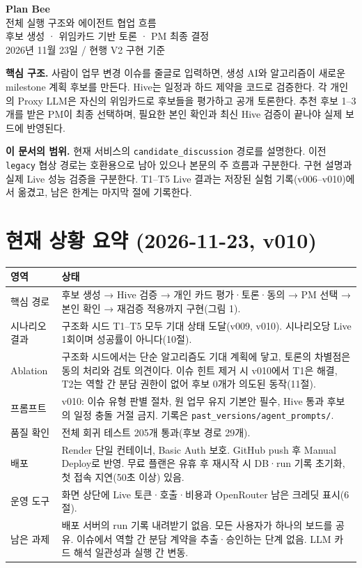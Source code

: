 \documentclass[11pt,a4paper]{article}
\begin{document}
\begin{center}
{\Huge\bfseries Plan Bee}\\[5mm]
{\LARGE 전체 실행 구조와 에이전트 협업 흐름}\\[3mm]
{\large 후보 생성 · 위임카드 기반 토론 · PM 최종 결정}\\[3mm]
2026년 11월 23일 / 현행 V2 구현 기준
\end{center}
\vspace{3mm}
\textbf{핵심 구조.} 사람이 업무 변경 이슈를 줄글로 입력하면, 생성 AI와 알고리즘이 새로운 milestone 계획 후보를 만든다. Hive는 일정과 하드 제약을 코드로 검증한다. 각 개인의 Proxy LLM은 자신의 위임카드로 후보들을 평가하고 공개 토론한다. 추천 후보 1--3개를 받은 PM이 최종 선택하며, 필요한 본인 확인과 최신 Hive 검증이 끝나야 실제 보드에 반영된다.

\textbf{이 문서의 범위.} 현재 서비스의 \texttt{candidate\_discussion} 경로를 설명한다. 이전 \texttt{legacy} 협상 경로는 호환용으로 남아 있으나 본문의 주 흐름과 구분한다. 구현 설명과 실제 Live 성능 검증을 구분한다. T1--T5 Live 결과는 저장된 실험 기록(v006--v010)에서 옮겼고, 남은 한계는 마지막 절에 기록한다.

\section*{현재 상황 요약 (2026-11-23, v010)}
\begin{tabularx}{\linewidth}{@{}p{26mm}Y@{}}\toprule
영역 & 상태\\\midrule
핵심 경로 & 후보 생성 → Hive 검증 → 개인 카드 평가·토론·동의 → PM 선택 → 본인 확인 → 재검증 적용까지 구현(그림 1).\\
시나리오 결과 & 구조화 시드 T1--T5 모두 기대 상태 도달(v009, v010). 시나리오당 Live 1회이며 성공률이 아니다(10절).\\
Ablation & 구조화 시드에서는 단순 알고리즘도 기대 계획에 닿고, 토론의 차별점은 동의 처리와 검토 의견이다. 이슈 힌트 제거 시 v010에서 T1은 해결, T2는 역할 간 분담 권한이 없어 후보 0개가 의도된 동작(11절).\\
프롬프트 & v010: 이슈 유형 판별 절차, 원 업무 유지 기본안 필수, Hive 통과 후보의 일정 충돌 거절 금지. 기록은 \texttt{past\_versions/agent\_prompts/}.\\
품질 확인 & 전체 회귀 테스트 205개 통과(후보 경로 29개).\\
배포 & Render 단일 컨테이너, Basic Auth 보호. GitHub push 후 Manual Deploy로 반영. 무료 플랜은 유휴 후 재시작 시 DB·run 기록 초기화, 첫 접속 지연(50초 이상) 있음.\\
운영 도구 & 화면 상단에 Live 토큰·호출·비용과 OpenRouter 남은 크레딧 표시(6절).\\
남은 과제 & 배포 서버의 run 기록 내려받기 없음. 모든 사용자가 하나의 보드를 공유. 이슈에서 역할 간 분담 계약을 추출·승인하는 단계 없음. LLM 카드 해석 일관성과 실행 간 변동.\\\bottomrule
\end{tabularx}
\end{document}
